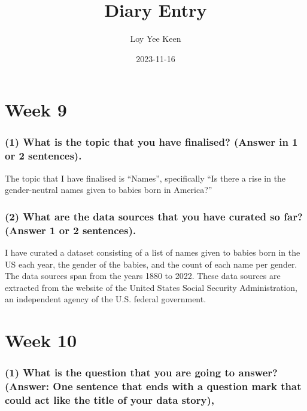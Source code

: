 \documentclass[
]{article}
\title{Diary Entry}
\author{Loy Yee Keen}
\date{2023-11-16}
\begin{document}
\maketitle

\hypertarget{week-9}{%
\section{Week 9}\label{week-9}}

\hypertarget{what-is-the-topic-that-you-have-finalised-answer-in-1-or-2-sentences.}{%
\subsubsection{(1) What is the topic that you have finalised? (Answer in
1 or 2
sentences).}\label{what-is-the-topic-that-you-have-finalised-answer-in-1-or-2-sentences.}}

The topic that I have finalised is ``Names'', specifically ``Is there a
rise in the gender-neutral names given to babies born in America?''

\hypertarget{what-are-the-data-sources-that-you-have-curated-so-far-answer-1-or-2-sentences.}{%
\subsubsection{(2) What are the data sources that you have curated so
far? (Answer 1 or 2
sentences).}\label{what-are-the-data-sources-that-you-have-curated-so-far-answer-1-or-2-sentences.}}

I have curated a dataset consisting of a list of names given to babies
born in the US each year, the gender of the babies, and the count of
each name per gender. The data sources span from the years 1880 to 2022.
These data sources are extracted from the website of the United States
Social Security Administration, an independent agency of the U.S.
federal government.

\hypertarget{week-10}{%
\section{Week 10}\label{week-10}}

\hypertarget{what-is-the-question-that-you-are-going-to-answer-answer-one-sentence-that-ends-with-a-question-mark-that-could-act-like-the-title-of-your-data-story}{%
\subsubsection{(1) What is the question that you are going to answer?
(Answer: One sentence that ends with a question mark that could act like
the title of your data
story),}\label{what-is-the-question-that-you-are-going-to-answer-answer-one-sentence-that-ends-with-a-question-mark-that-could-act-like-the-title-of-your-data-story}}
\end{document}

